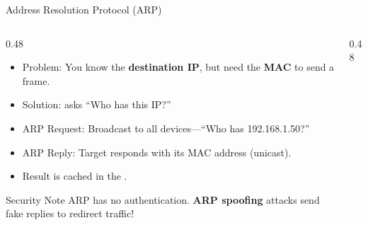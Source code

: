 \documentclass[aspectratio=169]{beamer}  %
\begin{document}
\begin{frame}{Address Resolution Protocol (ARP)}
    \begin{columns}[T]
        \begin{column}{0.48\textwidth}
            \begin{itemize}
                \item Problem: You know the \textbf{destination IP}, but need the \textbf{MAC} to send a frame.
                \item Solution:  asks ``Who has this IP?''
                \item ARP Request: Broadcast to all devices---``Who has 192.168.1.50?''
                \item ARP Reply: Target responds with its MAC address (unicast).
                \item Result is cached in the .
            \end{itemize}
            
            \vspace{0.3em}
            \begin{alertblock}{Security Note}
                ARP has no authentication. \textbf{ARP spoofing} attacks send fake replies to redirect traffic!
            \end{alertblock}
        \end{column}
        \begin{column}{0.48\textwidth}
            \begin{center}
\end{center}
\end{column}
\end{columns}
\end{frame}
\end{document}
